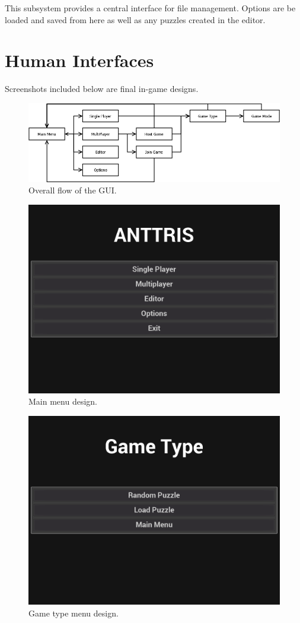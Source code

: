 \documentclass[12pt]{article}
\begin{document}
This subsystem provides a central interface for file management. Options are be loaded and saved from here as well as any puzzles created in the editor.
\section{Human Interfaces} %
Screenshots included below are final in-game designs.
	\begin{figure}[H]
        \centering
        \includegraphics[width=4.5in]{Anttris_MenuFlow.png}
        \caption{Overall flow of the GUI.}
    \end{figure}
    \begin{figure}[H]
        \centering
        \includegraphics[width=4.5in]{Anttris_MainMenu.png}
        \caption{Main menu design.}
    \end{figure}
    \begin{figure}[H]
        \centering
        \includegraphics[width=4.5in]{Anttris_GTMenu.png}
        \caption{Game type menu design.}
    \end{figure}
\end{document}
